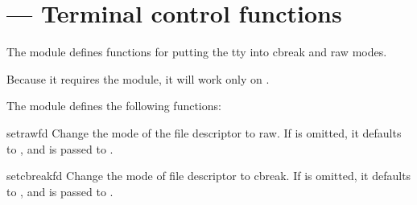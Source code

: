 \section{ ---
         Terminal control functions}


The  module defines functions for putting the tty into
cbreak and raw modes.

Because it requires the  module, it will work
only on \UNIX.

The  module defines the following functions:

\begin{funcdesc}{setraw}{fd}
Change the mode of the file descriptor  to raw. If 
is omitted, it defaults to , and is passed
to .
\end{funcdesc}

\begin{funcdesc}{setcbreak}{fd}
Change the mode of file descriptor  to cbreak. If 
is omitted, it defaults to , and is passed
to .
\end{funcdesc}


\begin{seealso}
\end{seealso}
